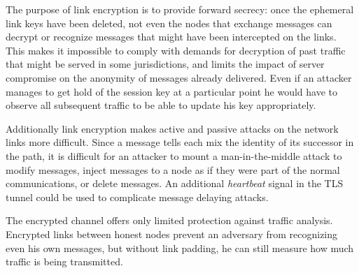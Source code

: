 \documentclass[times,10pt,twocolumn]{article}
\begin{document}
%

The purpose of link encryption is to provide forward secrecy: 
once the ephemeral link keys have been deleted, not even the
nodes that exchange messages can decrypt or recognize messages
that might have been intercepted on the links. This makes it
impossible to comply with demands for decryption of past traffic 
that might be served in
some jurisdictions, and limits the impact of server compromise on the
anonymity 
of messages already delivered.
Even if an
attacker manages to get hold of the session key at a particular point
he would have to observe all subsequent traffic to be able to update
his key appropriately.

Additionally link encryption makes active and passive attacks on the
network links more difficult. Since a message tells each mix the identity
of its successor in the path, it is difficult for an attacker to
mount a man-in-the-middle attack to modify messages, inject messages
to a node as if they were part of the normal communications, or delete
messages.  An additional \emph{heartbeat} signal in the TLS tunnel
could be used to complicate message delaying attacks.

The encrypted channel offers only limited protection against traffic
analysis. Encrypted links between honest nodes prevent an adversary
from recognizing even his own messages, but without link padding, he
can still measure how much traffic is being transmitted.
\end{document}

